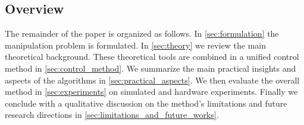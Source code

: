 \subsection{Overview}

The remainder of the paper is organized as follows. In 
\sect \ref{sec:formulation} the manipulation problem is formulated. In \sect \ref{sec:theory} we review the main theoretical background. These  theoretical tools are combined in a unified control method in \sect \ref{sec:control_method}. We summarize the main practical insights and aspects of the algorithms in \sect \ref{sec:practical_aspects}.
We then evaluate the overall method in \sect \ref{sec:experiments} on simulated and hardware experiments. Finally we conclude with a qualitative discussion on the method's limitations and future research directions in \sect \ref{sec:limitations_and_future_works}.

